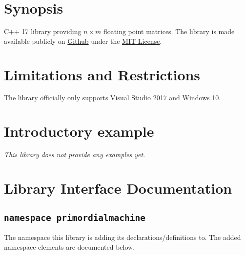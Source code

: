 \documentclass[oneside]{book}
\begin{document}
\frontmatter

\begin{titlepage}
\maketitle
\end{titlepage}

\tableofcontents
{}

\mainmatter

\chapter{Synopsis}
C++ 17 library providing $n \times m$ floating point matrices. 
The library is made available publicly on
\href{\GetLibraryRepository}{Github}
under the
\href{\GetLibraryRepository/blob/master/LICENSE}{MIT License}.

\chapter{Limitations and Restrictions}
The library officially only supports Visual Studio 2017 and Windows 10.

\chapter{Introductory example}
\textit{\color{orange}This library does not provide any examples yet.}



\chapter{Library Interface Documentation}

\section{\texttt{namespace primordialmachine}}
The namespace this library is adding its declarations/definitions to.
The added namespace elements are documented below.



\end{document}
